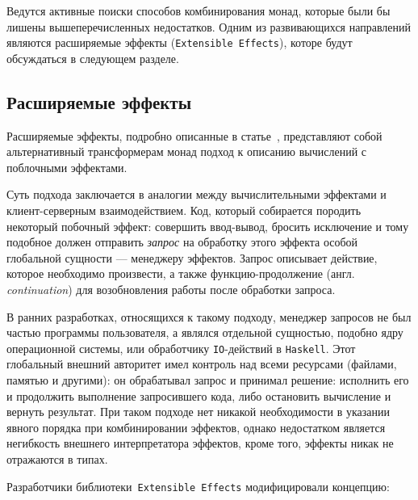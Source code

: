 Ведутся активные поиски способов комбинирования монад, которые были бы лишены
вышеперечисленных недостатков. Одним из развивающихся направлений являются
расширяемые эффекты (\lstinline{Extensible Effects}), которе будут обсуждаться
в следующем разделе.


\subsection{Расширяемые эффекты}

Расширяемые эффекты, подробно описанные в статье~\cite{extEffects}, представляют
собой альтернативный трансформерам монад подход к описанию вычислений с поблочными
эффектами.

Суть подхода заключается в аналогии между вычислительными эффектами и
клиент-серверным взаимодействием. Код, который собирается породить некоторый
побочный эффект: совершить ввод-вывод, бросить исключение и тому подобное должен
отправить \emph{запрос} на обработку этого эффекта особой глобальной сущности
--- менеджеру эффектов. Запрос описывает действие, которое необходимо
произвести, а также функцию-продолжение (англ. \emph{continuation}) для
возобновления работы после обработки запроса.

В ранних разработках, относящихся к такому подходу, менеджер запросов не был
частью программы пользователя, а являлся отдельной сущностью, подобно ядру
операционной системы, или обработчику \lstinline{IO}-действий в
\lstinline{Haskell}. Этот глобальный внешний авторитет имел контроль над всеми
ресурсами (файлами, памятью и другими): он обрабатывал запрос и принимал решение:
исполнить его и продолжить выполнение запросившего кода, либо остановить
вычисление и вернуть результат. При таком подходе нет никакой необходимости в
указании явного порядка при комбинировании эффектов, однако недостатком является
негибкость внешнего интерпретатора эффектов, кроме того, эффекты никак
не отражаются в типах.

Разработчики библиотеки~\lstinline{Extensible Effects} модифицировали концепцию:

